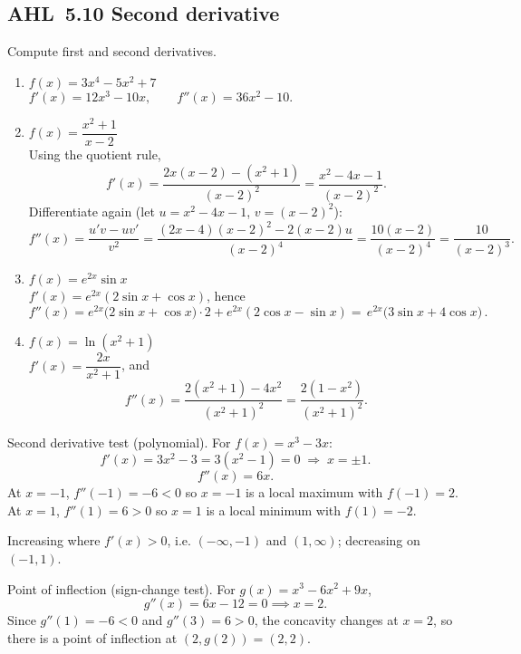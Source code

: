 \documentclass[11pt]{article}
\def\textbf#1{#1}%
\newcommand{\tocsubsection}[1]{\subsection{#1}}
\begin{document}
\tocsubsection{AHL 5.10 Second derivative}


\begin{solution}
\textbf{Compute first and second derivatives.}
\begin{enumerate}
  \item $f(x)=3x^{4}-5x^{2}+7$\\[2pt]
  $f'(x)=12x^{3}-10x,\qquad f''(x)=36x^{2}-10.$

  \item $f(x)=\dfrac{x^{2}+1}{x-2}$\\[2pt]
  Using the quotient rule,
  \[
  f'(x)=\frac{2x(x-2)-(x^{2}+1)}{(x-2)^{2}}
       =\frac{x^{2}-4x-1}{(x-2)^{2}}.
  \]
  Differentiate again (let $u=x^{2}-4x-1$, $v=(x-2)^{2}$):
  \[
  f''(x)=\frac{u'v-uv'}{v^{2}}
        =\frac{(2x-4)(x-2)^{2}-2(x-2)u}{(x-2)^{4}}
        =\frac{10(x-2)}{(x-2)^{4}}
        =\boxed{\frac{10}{(x-2)^{3}}}.
  \]

  \item $f(x)=e^{2x}\sin x$\\[2pt]
  $f'(x)=e^{2x}(2\sin x+\cos x)$, hence
  \[
  f''(x)=e^{2x}\big(2\sin x+\cos x\big)\cdot 2+e^{2x}(2\cos x-\sin x)
        =\boxed{\,e^{2x}\big(3\sin x+4\cos x\big)\,}.
  \]

  \item $f(x)=\ln(x^{2}+1)$\\[2pt]
  $f'(x)=\dfrac{2x}{x^{2}+1}$, and
  \[
  f''(x)=\frac{2(x^{2}+1)-4x^{2}}{(x^{2}+1)^{2}}
        =\boxed{\frac{2(1-x^{2})}{(x^{2}+1)^{2}}}.
  \]
\end{enumerate}
\end{solution}

\begin{solution}
\textbf{Second derivative test (polynomial).} For $f(x)=x^{3}-3x$:
\[
f'(x)=3x^{2}-3=3(x^{2}-1)=0 \;\Rightarrow\; x=\pm 1.
\]
\[
f''(x)=6x.
\]
At $x=-1$, $f''(-1)=-6<0$ so $x=-1$ is a local maximum with $f(-1)=2$.
At $x=1$, $f''(1)=6>0$ so $x=1$ is a local minimum with $f(1)=-2$.

Increasing where $f'(x)>0$, i.e. $(-\infty,-1)$ and $(1,\infty)$; decreasing on $(-1,1)$.
\end{solution}

\begin{solution}
\textbf{Point of inflection (sign-change test).} For $g(x)=x^{3}-6x^{2}+9x$,
\[
g''(x)=6x-12=0 \implies x=2.
\]
Since $g''(1)=-6<0$ and $g''(3)=6>0$, the concavity changes at $x=2$, so there is a point of inflection at $(2,g(2))=(2,2)$.
\end{solution}
\end{document}
